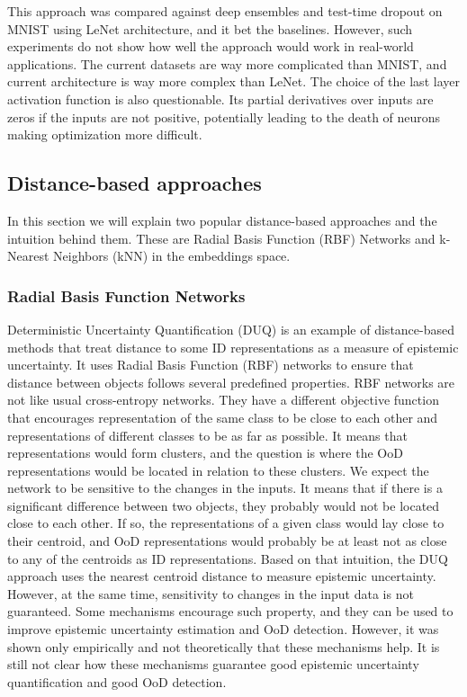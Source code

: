\documentclass{article}
\begin{document}
This approach was compared against deep ensembles and test-time dropout on MNIST using LeNet architecture, and it bet the baselines.
However, such experiments do not show how well the approach would work in real-world applications.
The current datasets are way more complicated than MNIST, and current architecture is way more complex than LeNet.
The choice of the last layer activation function is also questionable.
Its partial derivatives over inputs are zeros if the inputs are not positive, potentially leading to the death of neurons making optimization more difficult.

\subsection{Distance-based approaches}
In this section we will explain two popular distance-based approaches and the intuition behind them.
These are Radial Basis Function (RBF) Networks and k-Nearest Neighbors (kNN) in the embeddings space.

\subsubsection{Radial Basis Function Networks}
Deterministic Uncertainty Quantification (DUQ) \cite{duq} is an example of distance-based methods that treat distance to some ID representations as a measure of epistemic uncertainty.
It uses Radial Basis Function (RBF) networks to ensure that distance between objects follows several predefined properties.
RBF networks are not like usual cross-entropy networks. They have a different objective function that encourages representation of the same class to be close to each other and representations of different classes to be as far as possible.
It means that representations would form clusters, and the question is where the OoD representations would be located in relation to these clusters.
We expect the network to be sensitive to the changes in the inputs.
It means that if there is a significant difference between two objects, they probably would not be located close to each other.
If so, the representations of a given class would lay close to their centroid, and OoD representations would probably be at least not as close to any of the centroids as ID representations.
Based on that intuition, the DUQ approach uses the nearest centroid distance to measure epistemic uncertainty.
However, at the same time, sensitivity to changes in the input data is not guaranteed.
Some mechanisms encourage such property, and they can be used to improve epistemic uncertainty estimation and OoD detection. However, it was shown only empirically and not theoretically that these mechanisms help.
It is still not clear how these mechanisms guarantee good epistemic uncertainty quantification and good OoD detection.
\end{document}
